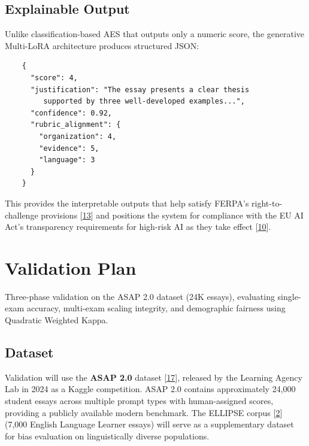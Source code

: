 \documentclass[12pt]{article}
\begin{document}
\subsection{Explainable Output}

Unlike classification-based AES that outputs only a numeric score, the generative Multi-LoRA architecture produces structured JSON:

\begin{verbatim}
    {
      "score": 4,
      "justification": "The essay presents a clear thesis
         supported by three well-developed examples...",
      "confidence": 0.92,
      "rubric_alignment": {
        "organization": 4,
        "evidence": 5,
        "language": 3
      }
    }
\end{verbatim}

\noindent This provides the interpretable outputs that help satisfy FERPA's right-to-challenge provisions [\hyperlink{ref13}{13}] and positions the system for compliance with the EU AI Act's transparency requirements for high-risk AI as they take effect [\hyperlink{ref10}{10}].

\section{Validation Plan}

\begin{ataglance}
\singlespacing
Three-phase validation on the ASAP 2.0 dataset (24K essays), evaluating single-exam accuracy, multi-exam scaling integrity, and demographic fairness using Quadratic Weighted Kappa.
\end{ataglance}

\subsection{Dataset}

Validation will use the \textbf{ASAP 2.0} dataset [\hyperlink{ref17}{17}], released by the Learning Agency Lab in 2024 as a Kaggle competition. ASAP 2.0 contains approximately 24,000 student essays across multiple prompt types with human-assigned scores, providing a publicly available modern benchmark. The ELLIPSE corpus [\hyperlink{ref2}{2}] (7,000 English Language Learner essays) will serve as a supplementary dataset for bias evaluation on linguistically diverse populations.
\end{document}
